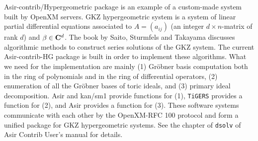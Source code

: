 Asir-contrib/Hypergeometric package is an 
example of a custom-made system built by OpenXM servers.
GKZ hypergeometric system is a system of linear partial differential
equations associated to $A=(a_{ij})$  
(an integer $d\times n$-matrix of rank $d$)
and $\beta \in {\bf C}^d$.
The book by Saito, Sturmfels and Takayama \cite{sst-book}
discusses algorithmic methods to construct series solutions of the GKZ
system.
The current Asir-contrib-HG package is built in order to implement
these algorithms.
What we need for the implementation are mainly
(1) Gr\"obner basis computation both in the ring of polynomials
and in the ring of differential operators,
(2) enumeration of all the Gr\"obner bases of toric ideals,
and 
(3) primary ideal decomposition.
Asir and kan/sm1 provide functions for (1),
{\tt TiGERS} provides a function for (2),
and
Asir provides a function for (3).
These software systems communicate with each other 
by the OpenXM-RFC 100 protocol
and form a unified package for GKZ hypergeometric systems.
See the chapter of {\tt dsolv} of Asir Contrib User's manual \cite{openxm-web}
for details.

